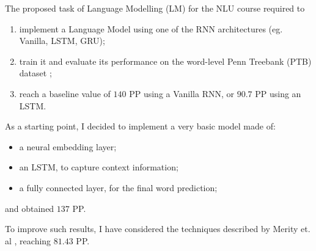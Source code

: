 The proposed task of Language Modelling (LM) for the NLU course required to
\begin{enumerate}
    \item implement a Language Model using one of the RNN architectures (eg. Vanilla, LSTM, GRU);
    \item train it and evaluate its performance on the word-level Penn Treebank (PTB) dataset \cite{mikolovRecurrentNeuralNetwork2010a};
    \item reach a baseline value of $140$ PP using a Vanilla RNN, or $90.7$ PP using an LSTM.
\end{enumerate}

As a starting point, I decided to implement a very basic model made of:
\begin{itemize}
    \item a neural embedding layer;
    \item an LSTM, to capture context information;
    \item a fully connected layer, for the final word prediction;
\end{itemize}
and obtained $137$ PP.

To improve such results, I have considered the techniques described by Merity et. al \cite{merityRegularizingOptimizingLSTM2017}, reaching $81.43$ PP.